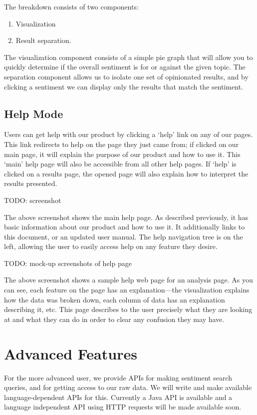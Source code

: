 \documentclass[titlepage]{article}
\begin{document}
The breakdown consists of two components:
\begin{enumerate}
\item Visualization
\item Result separation.
\end{enumerate}

The visualization component consists of a simple pie graph that will allow you
to quickly determine if the overall sentiment is for or against the given
topic.  The separation component allows us to isolate one set of opinionated
results, and by clicking a sentiment we can display only the results that
match the sentiment.


\subsection{Help Mode}
Users can get help with our product by clicking a `help' link on any of our
pages.  This link redirects to help on the page they just came from; if
clicked on our main page, it will explain the purpose of our product and how
to use it.  This `main' help page will also be accessible from all other help
pages.  If `help' is clicked on a results page, the opened page will also
explain how to interpret the results presented.

    TODO: screenshot

The above screenshot shows the main help page.  As described previously, it
has basic information about our product and how to use it.  It additionally
links to this document, or an updated user manual.  The help navigation tree
is on the left, allowing the user to easily access help on any feature they
desire.

    TODO: mock-up screenshots of help page

The above screenshot shows a sample help web page for an analysis page.  As
you can see, each feature on the page has an explanation---the visualization
explains how the data was broken down, each column of data has an explanation
describing it, etc.  This page describes to the user precisely what they are
looking at and what they can do in order to clear any confusion they may
have.

\section{Advanced Features}
For the more advanced user, we provide APIs for making sentiment search
queries, and for getting access to our raw data.  We will write and make
available language-dependent APIs for this.  Currently a Java API is available
and a language independent API using HTTP requests will be made available
soon.
\end{document}
